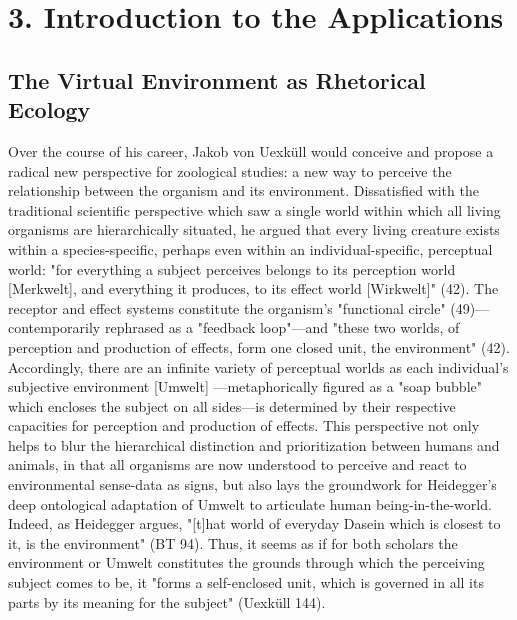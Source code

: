 \documentclass{article}
\begin{document}
\bigskip

\bigskip

\section*{3. Introduction to the Applications}

\subsection*{The Virtual Environment as Rhetorical Ecology}

Over the course of his career, Jakob von Uexküll would conceive and propose a radical new perspective for zoological studies: a new way to perceive the relationship between the organism and its environment. Dissatisfied with the traditional scientific perspective which saw a single world within which all living organisms are hierarchically situated, he argued that every living creature exists within a species-specific, perhaps even within an individual-specific, perceptual world: "for everything a subject perceives belongs to its perception world [Merkwelt], and everything it produces, to its effect world [Wirkwelt]" (42). The receptor and effect systems constitute the organism's "functional circle" (49)—contemporarily rephrased as a "feedback loop"—and "these two worlds, of perception and production of effects, form one closed unit, the environment" (42). Accordingly, there are an infinite variety of perceptual worlds as each individual's subjective environment [Umwelt] —metaphorically figured as a "soap bubble" which encloses the subject on all sides—is determined by their respective capacities for perception and production of effects. This perspective not only helps to blur the hierarchical distinction and prioritization between humans and animals, in that all organisms are now understood to perceive and react to environmental sense-data as signs, but also lays the groundwork for Heidegger's deep ontological adaptation of Umwelt to articulate human being-in-the-world. Indeed, as Heidegger argues, "[t]hat world of everyday Dasein which is closest to it, is the environment" (BT 94). Thus, it seems as if for both scholars the environment or Umwelt constitutes the grounds through which the perceiving subject comes to be, it "forms a self-enclosed unit, which is governed in all its parts by its meaning for the subject" (Uexküll 144).
\end{document}
